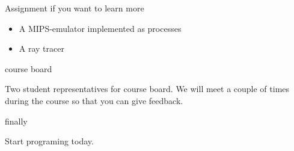 \begin{frame}{Assignment if you want to learn more}

  \begin{itemize}
    \item A MIPS-emulator implemented as processes\pause
    \item A ray tracer\pause
  \end{itemize}

\end{frame}

\begin{frame}{course board}

  Two student representatives for course board. We will meet a couple
  of times during the course so that you can give feedback.

\end{frame}


\begin{frame}{finally}

  \pause\vspace{60pt}\hspace{40pt} Start programing today.

\end{frame}



